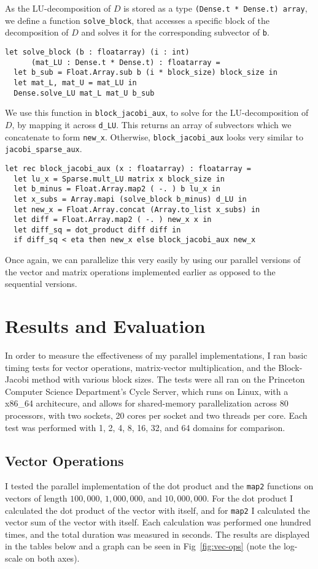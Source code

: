 \documentclass[pageno]{jpaper}
\begin{document}
\begin{doublespacing}
As the LU-decomposition of $D$ is stored as a type \verb|(Dense.t * Dense.t) array|, we define a function \verb|solve_block|, that accesses a specific block of the decomposition of $D$ and solves it for the corresponding subvector of \verb|b|.

\begin{verbatim}
let solve_block (b : floatarray) (i : int)
      (mat_LU : Dense.t * Dense.t) : floatarray = 
  let b_sub = Float.Array.sub b (i * block_size) block_size in
  let mat_L, mat_U = mat_LU in
  Dense.solve_LU mat_L mat_U b_sub
\end{verbatim}

We use this function in \verb|block_jacobi_aux|, to solve for the LU-decomposition of $D$, by mapping it across \verb|d_LU|. This returns an array of subvectors which we concatenate to form \verb|new_x|. Otherwise, \verb|block_jacobi_aux| looks very similar to \verb|jacobi_sparse_aux|.

\begin{verbatim}
let rec block_jacobi_aux (x : floatarray) : floatarray = 
  let lu_x = Sparse.mult_LU matrix x block_size in
  let b_minus = Float.Array.map2 ( -. ) b lu_x in
  let x_subs = Array.mapi (solve_block b_minus) d_LU in
  let new_x = Float.Array.concat (Array.to_list x_subs) in
  let diff = Float.Array.map2 ( -. ) new_x x in
  let diff_sq = dot_product diff diff in
  if diff_sq < eta then new_x else block_jacobi_aux new_x
\end{verbatim}

Once again, we can parallelize this very easily by using our parallel versions of the vector and matrix operations implemented earlier as opposed to the sequential versions.

\section{Results and Evaluation}
\label{sec:results}
In order to measure the effectiveness of my parallel implementations, I ran basic timing tests for vector operations, matrix-vector multiplication, and the Block-Jacobi method with various block sizes. The tests were all ran on the Princeton Computer Science Department's Cycle Server, which runs on Linux, with a x86\_64 architecure, and allows for shared-memory parallelization across 80 processors, with two sockets, 20 cores per socket and two threads per core. Each test was performed with 1, 2, 4, 8, 16, 32, and 64 domains for comparison.

\subsection{Vector Operations}
I tested the parallel implementation of the dot product and the \verb|map2| functions on vectors of length $100,000$, $1,000,000$, and $10,000,000$. For the dot product I calculated the dot product of the vector with itself, and for \verb|map2| I calculated the vector sum of the vector with itself. Each calculation was performed one hundred times, and the total duration was measured in seconds. The results are displayed in the tables below and a graph can be seen in Fig~\ref{fig:vec-ops} (note the log-scale on both axes).


\end{doublespacing}
\end{document}
